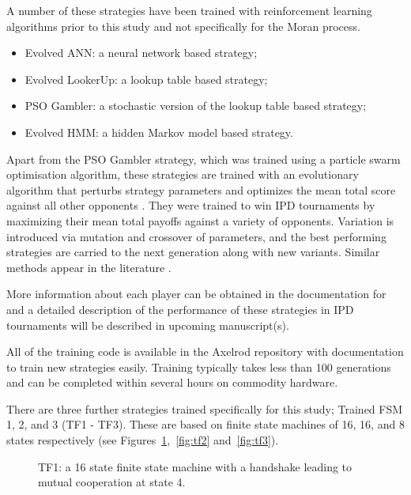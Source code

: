 \documentclass{article}
\begin{document}
A number of these strategies have been trained with reinforcement learning
algorithms prior to this study and not specifically for the Moran process.

\begin{itemize}
    \item Evolved ANN: a neural network based strategy;
    \item Evolved LookerUp: a lookup table based strategy;
    \item PSO Gambler: a stochastic version of the lookup table based strategy;
    \item Evolved HMM: a hidden Markov model based strategy.
\end{itemize}

Apart from the PSO Gambler strategy, which was trained using a particle swarm
optimisation algorithm, these strategies are trained with an evolutionary
algorithm that perturbs strategy parameters and optimizes the mean total score
against all other opponents \cite{affenzeller2009genetic}. They were trained to
win IPD tournaments by maximizing their mean total payoffs against a variety
of opponents. Variation is
introduced via mutation and crossover of parameters, and the best performing
strategies are carried to the next generation along with new variants. Similar
methods appear in the literature \cite{Ashlock2006}.

More information about each player can be obtained in the documentation for
\cite{axelrodproject} and a detailed description of the performance
 of these strategies in IPD tournaments will be described in upcoming manuscript(s).

All of the training code is available in the
Axelrod repository with documentation to train new strategies easily. Training
typically takes less than 100 generations and can be completed within several
hours on commodity hardware.

There are three further strategies trained specifically for this study; Trained
FSM 1, 2, and 3 (TF1 - TF3). These are based on finite state machines of 16, 16,
and 8 states respectively (see Figures~\ref{fig:tf1},~\ref{fig:tf2}
and~\ref{fig:tf3}).


\begin{figure}[!hbtp]
    \centering
    
    \caption{TF1: a 16 state finite state machine with a handshake leading to
    mutual cooperation at state 4.}
    \label{fig:tf1}
\end{figure}
\end{document}
